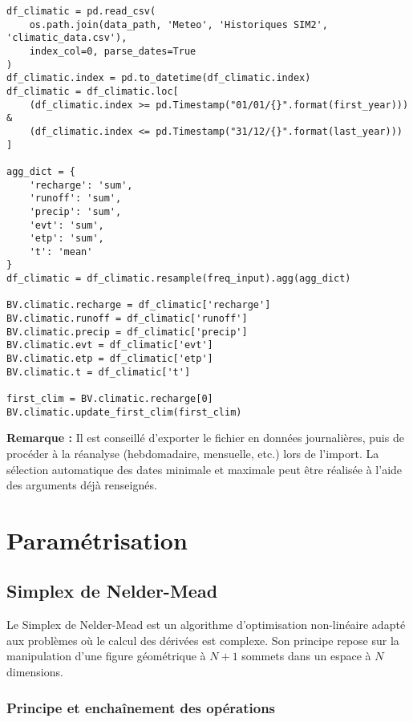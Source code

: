 \begin{verbatim}
df_climatic = pd.read_csv(
    os.path.join(data_path, 'Meteo', 'Historiques SIM2', 'climatic_data.csv'),
    index_col=0, parse_dates=True
)
df_climatic.index = pd.to_datetime(df_climatic.index)
df_climatic = df_climatic.loc[
    (df_climatic.index >= pd.Timestamp("01/01/{}".format(first_year))) &
    (df_climatic.index <= pd.Timestamp("31/12/{}".format(last_year)))
]

agg_dict = {
    'recharge': 'sum',
    'runoff': 'sum',
    'precip': 'sum',
    'evt': 'sum',
    'etp': 'sum',
    't': 'mean'
}
df_climatic = df_climatic.resample(freq_input).agg(agg_dict)

BV.climatic.recharge = df_climatic['recharge']
BV.climatic.runoff = df_climatic['runoff']
BV.climatic.precip = df_climatic['precip']
BV.climatic.evt = df_climatic['evt']
BV.climatic.etp = df_climatic['etp']
BV.climatic.t = df_climatic['t']

first_clim = BV.climatic.recharge[0]
BV.climatic.update_first_clim(first_clim)
\end{verbatim}

\begin{TipBox}
    \textbf{Remarque :} Il est conseillé d’exporter le fichier en données journalières, puis de procéder à la réanalyse (hebdomadaire, mensuelle, etc.) lors de l’import. La sélection automatique des dates minimale et maximale peut être réalisée à l’aide des arguments déjà renseignés.
\end{TipBox}

\section{Paramétrisation}
\label{sec:parametrisation}

\subsection{Simplex de Nelder-Mead}
\label{sec:simplex}

Le Simplex de Nelder-Mead est un algorithme d'optimisation non-linéaire adapté aux problèmes où le calcul des dérivées est complexe. Son principe repose sur la manipulation d'une figure géométrique à \(N+1\) sommets dans un espace à \(N\) dimensions.

\subsubsection{Principe et enchaînement des opérations}

